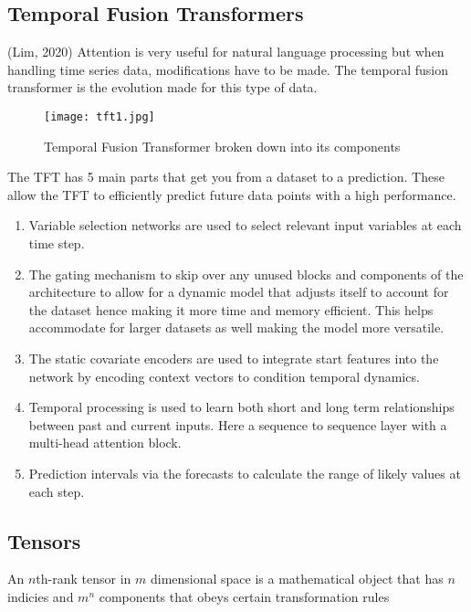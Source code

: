 \documentclass{article}
\begin{document}
\subsection{Temporal Fusion Transformers}
(Lim, 2020)
Attention is very useful for natural language processing but when handling time series data,
modifications have to be made. The temporal fusion transformer is the evolution made for this
type of data.
\begin{figure}[h!]
    \centering
    \texttt{[image: tft1.jpg]}
    \caption{Temporal Fusion Transformer broken down into its components}
\end{figure}
The TFT has 5 main parts that get you from a dataset to a prediction. These allow the TFT to
efficiently predict future data points with a high performance.
\begin{enumerate}
\item Variable selection networks are used to select relevant input variables at each time step.
\item The gating mechanism to skip over any unused blocks and components of the architecture to allow for a dynamic model that adjusts itself to account for the dataset hence making it more time and memory efficient. This helps accommodate for larger datasets as well making the model more versatile.
\item The static covariate encoders are used to integrate start features into the network by encoding context vectors to condition temporal dynamics.
\item Temporal processing is used to learn both short and long term relationships between past and current inputs. Here a sequence to sequence layer with a multi-head attention block.
\item Prediction intervals via the forecasts to calculate the range of likely values at each step.
\end{enumerate}

\subsection{Tensors}
An $n$th-rank tensor in $m$ dimensional space is a mathematical object that has $n$ indicies and $m^n$ components that obeys certain transformation rules
\end{document}
